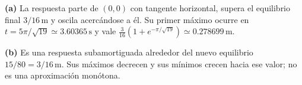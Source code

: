 \noindent\textbf{(a)} La respuesta parte de $(0,0)$ con tangente horizontal, supera el equilibrio final $3/16\,\mathrm m$ y oscila acercándose a él. Su primer máximo ocurre en $t=5\pi/\sqrt{19}\simeq3.60365\,\mathrm s$ y vale $\frac3{16}(1+e^{-\pi/\sqrt{19}})\simeq0.278699\,\mathrm m$.

\noindent\textbf{(b)} Es una respuesta subamortiguada alrededor del nuevo equilibrio $15/80=3/16\,\mathrm m$. Sus máximos decrecen y sus mínimos crecen hacia ese valor; no es una aproximación monótona.
